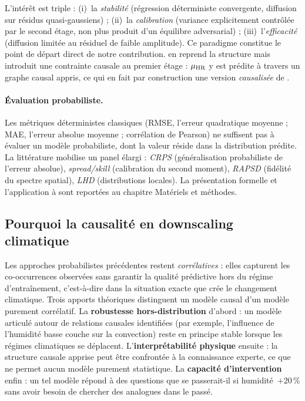 L'intérêt est triple : (i)~la \emph{stabilité} (régression déterministe convergente, diffusion sur résidus quasi-gaussiens) ; (ii)~la \emph{calibration} (variance explicitement contrôlée par le second étage, non plus produit d'un équilibre adversarial) ; (iii)~l'\emph{efficacité} (diffusion limitée au résiduel de faible amplitude). Ce paradigme constitue le point de départ direct de notre contribution. \Oracle{} en reprend la structure mais introduit une contrainte causale au premier étage : $\mu_{\text{HR}}$ y est prédite à travers un graphe causal appris, ce qui en fait par construction une version \emph{causalisée} de \CorrDiff{}.

\paragraph{Évaluation probabiliste.}
\label{ssec:eval-encart}
Les métriques déterministes classiques (RMSE, l'erreur quadratique moyenne ; MAE, l'erreur absolue moyenne ; corrélation de Pearson) ne suffisent pas à évaluer un modèle probabiliste, dont la valeur réside dans la distribution prédite. La littérature mobilise un panel élargi : \emph{CRPS} (généralisation probabiliste de l'erreur absolue), \emph{spread/skill} (calibration du second moment), \emph{RAPSD} (fidélité du spectre spatial), \emph{LHD} (distributions locales). La présentation formelle et l'application à \Oracle{} sont reportées au chapitre Matériels et méthodes.

\label{sec:causalite}

\subsection{Pourquoi la causalité en downscaling climatique}
\label{ssec:why-causal}

Les approches probabilistes précédentes restent \emph{corrélatives} : elles capturent les co-occurrences observées sans garantir la qualité prédictive hors du régime d'entraînement, c'est-à-dire dans la situation exacte que crée le changement climatique. Trois apports théoriques distinguent un modèle causal d'un modèle purement corrélatif. La \textbf{robustesse hors-distribution} d'abord : un modèle articulé autour de relations causales identifiées (par exemple, l'influence de l'humidité basse couche sur la convection) reste en principe stable lorsque les régimes climatiques se déplacent. L'\textbf{interprétabilité physique} ensuite : la structure causale apprise peut être confrontée à la connaissance experte, ce que ne permet aucun modèle purement statistique. La \textbf{capacité d'intervention} enfin : un tel modèle répond à des questions \og que se passerait-il si humidité~$+20\,\%$ \fg{} sans avoir besoin de chercher des analogues dans le passé.

